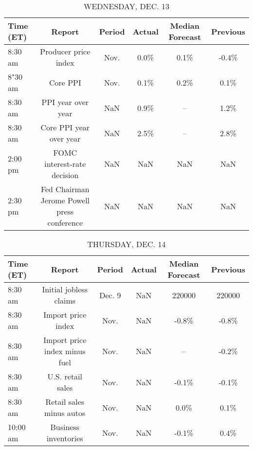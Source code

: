 \documentclass{article}%
\begin{document}
\begin{table}[htbp]%
\caption{WEDNESDAY, DEC. 13}%
\centering%
\begin{adjustbox}{width=1\textwidth}%
\begin{tabular}{lccccc}
\toprule
Time (ET) &                                      Report & Period & Actual & Median Forecast & Previous \\
\midrule
  8:30 am &                        Producer price index &   Nov. &   0.0\% &            0.1\% &    -0.4\% \\
  8"30 am &                                    Core PPI &   Nov. &   0.1\% &            0.2\% &     0.1\% \\
  8:30 am &                          PPI year over year &    NaN &   0.9\% &              -- &     1.2\% \\
  8:30 am &                     Core PPI year over year &    NaN &   2.5\% &              -- &     2.8\% \\
  2:00 pm &                 FOMC interest-rate decision &    NaN &    NaN &             NaN &      NaN \\
  2:30 pm & Fed Chairman Jerome Powell press conference &    NaN &    NaN &             NaN &      NaN \\
\bottomrule
\end{tabular}
%
\end{adjustbox}%
\end{table}

%


\begin{table}[htbp]%
\caption{THURSDAY, DEC. 14}%
\centering%
\begin{adjustbox}{width=1\textwidth}%
\begin{tabular}{lccccc}
\toprule
Time (ET) &                        Report & Period & Actual & Median Forecast & Previous \\
\midrule
  8:30 am &        Initial jobless claims & Dec. 9 &    NaN &          220000 &   220000 \\
  8:30 am &            Import price index &   Nov. &    NaN &           -0.8\% &    -0.8\% \\
  8:30 am & Import price index minus fuel &   Nov. &    NaN &              -- &    -0.2\% \\
  8:30 am &             U.S. retail sales &   Nov. &    NaN &           -0.1\% &    -0.1\% \\
  8:30 am &      Retail sales minus autos &   Nov. &    NaN &            0.0\% &     0.1\% \\
 10:00 am &          Business inventories &   Nov. &    NaN &           -0.1\% &     0.4\% \\
\bottomrule
\end{tabular}
%
\end{adjustbox}%
\end{table}
\end{document}
